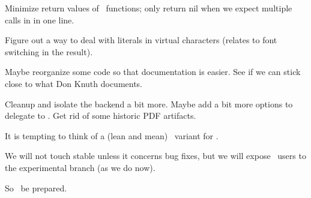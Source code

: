     Minimize return values of \Lua\ functions; only return nil when we expect
    multiple calls in in one line.

\stopstandardmakeup

\startstandardmakeup


    Figure out a way to deal with literals in virtual characters (relates to font
    switching in the result).

\stopstandardmakeup

\startstandardmakeup


    Maybe reorganize some code so that documentation is easier. See if we can stick
    close to what Don Knuth documents.

\stopstandardmakeup

\startstandardmakeup


    Cleanup and isolate the backend a bit more. Maybe add a bit more options to
    delegate to \Lua. Get rid of some historic PDF artifacts.

\stopstandardmakeup

\startstandardmakeup


    It is tempting to think of a (lean and mean) \LuaTeX\ variant for \ConTeXt.

    We will not touch stable unless it concerns bug fixes, but we will expose
    \ConTeXt\ users to the experimental branch (as we do now).

    So \unknown\ be prepared.

\stopstandardmakeup

\stopdocument

